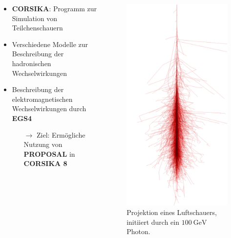 \documentclass[aspectratio=1610, captions=tableheading, 11pt]{beamer}
\begin{document}
\begin{frame}
  \begin{columns}
    \begin{center}
      \begin{itemize}
        \setlength\itemsep{0.5em}
        \item \textbf{CORSIKA}: Programm zur Simulation von Teilchenschauern
        \item Verschiedene Modelle zur Beschreibung der hadronischen Wechselwirkungen
        \item Beschreibung der elektromagnetischen Wechselwirkungen durch \textbf{EGS4}
        \begin{itemize}
          \item[$\rightarrow$] Ziel: Ermögliche Nutzung von \textbf{PROPOSAL} in \textbf{CORSIKA 8}
        \end{itemize}
      \end{itemize}
  \end{center}
      \begin{figure}
          \centering
          \includegraphics[width=0.4\linewidth]{plots/corsika.png}
           \captionsetup{format=myformat}
          \caption*{Projektion eines Luftschauers, initiiert durch ein $\SI{100}{\giga\electronvolt}$ Photon\footnotemark.}
      \end{figure}
  \end{columns}
\end{frame}
\end{document}
